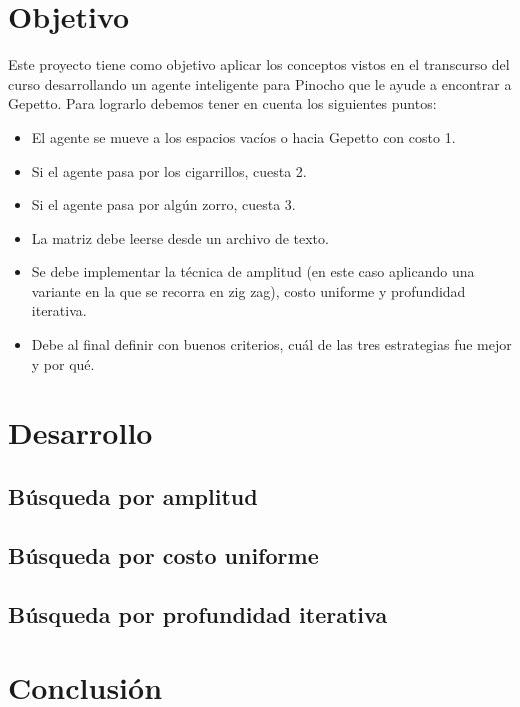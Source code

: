 \documentclass[12pt, letterpaper]{article}
\begin{document}
\section{Objetivo}
Este proyecto tiene como objetivo aplicar los conceptos vistos en el transcurso del curso desarrollando un agente inteligente para Pinocho que le ayude a encontrar a Gepetto. Para lograrlo debemos tener en cuenta los siguientes puntos:
\begin{itemize}
    \item El agente se mueve a los espacios vacíos o hacia Gepetto con costo 1.
    \item Si el agente pasa por los cigarrillos, cuesta 2.
    \item Si el agente pasa por algún zorro, cuesta 3.
    \item La matriz debe leerse desde un archivo de texto.
    \item Se debe implementar la técnica de amplitud (en este caso aplicando una variante en la que se recorra en zig zag), costo uniforme y profundidad iterativa.
    \item Debe al final definir con buenos criterios, cuál de las tres estrategias fue mejor y por qué.
\end{itemize}
\clearpage
\section{Desarrollo}

\subsection{Búsqueda por amplitud}

\subsection{Búsqueda por costo uniforme}

\subsection{Búsqueda por profundidad iterativa}

\section{Conclusión}

\end{document}
